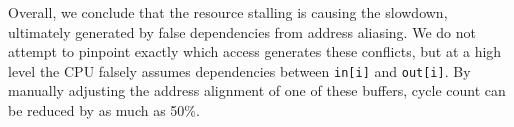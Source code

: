 \documentclass[10pt, conference, compsocconf]{IEEEtran}
\begin{document}
Overall, we conclude that the resource stalling is causing the slowdown, ultimately generated by false dependencies from address aliasing.
We do not attempt to pinpoint exactly which access generates these conflicts, but at a high level the CPU falsely assumes dependencies between \texttt{in[i]} and \texttt{out[i]}.
By manually adjusting the address alignment of one of these buffers, cycle count can be reduced by as much as 50\%.


\end{document}
